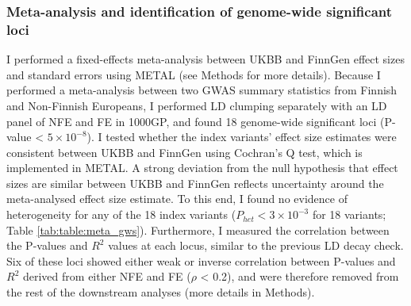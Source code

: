     \subsubsection{Meta-analysis and identification of genome-wide significant loci}
    I performed a fixed-effects meta-analysis between UKBB and FinnGen effect sizes and standard errors using METAL (see Methods for more details). Because I performed a meta-analysis between two GWAS summary statistics from Finnish and Non-Finnish Europeans, I performed LD clumping separately with an LD panel of NFE and FE in 1000GP, and found 18 genome-wide significant loci (P-value < $5\times10^{-8}$). I tested whether the index variants' effect size estimates were consistent between UKBB and FinnGen using Cochran's Q test, which is implemented in METAL. A strong deviation from the null hypothesis that effect sizes are similar between UKBB and FinnGen reflects uncertainty around the meta-analysed effect size estimate. To this end, I found no evidence of heterogeneity for any of the 18 index variants ($P_{het} < 3\times10^{-3}$ for 18 variants; Table \ref{tab:table:meta_gws}). Furthermore, I measured the correlation between the P-values and $R^{2}$ values at each locus, similar to the previous LD decay check. Six of these loci showed either weak or inverse correlation between P-values and $R^{2}$ derived from either NFE and FE ($\rho$ < 0.2), and were therefore removed from the rest of the downstream analyses (more details in Methods).\\
    


